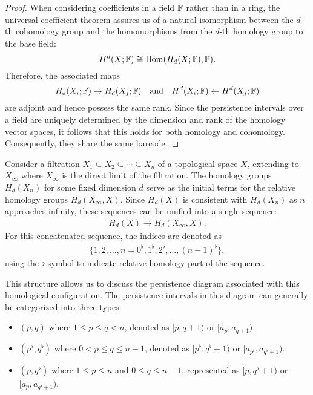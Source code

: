 \begin{proof}
When considering coefficients in a field ${\mathbb{F}}$ rather than in a ring, the universal coefficient theorem assures us of a natural isomorphism between the $d$-th cohomology group and the homomorphisms from the $d$-th homology group to the base field:
\begin{equation}
H^{d}(X; {\mathbb{F}}) \cong \operatorname{Hom}(H_{d}(X; {\mathbb{F}}), {\mathbb{F}}).
\end{equation}
Therefore, the associated maps
\begin{equation}
H_{d}(X_{i}; {\mathbb{F}}) \rightarrow H_{d}(X_{j}; {\mathbb{F}}) \quad \text{and} \quad H^{d}(X_{i}; {\mathbb{F}}) \leftarrow H^{d}(X_{j}; {\mathbb{F}})
\end{equation}
are adjoint and hence possess the same rank. Since the persistence intervals over a field are uniquely determined by the dimension and rank of the homology vector spaces, it follows that this holds for both homology and cohomology. Consequently, they share the same barcode.
\end{proof}

Consider a filtration $X_{1} \subseteq X_{2} \subseteq \cdots \subseteq X_{n}$ of a topological space $X$, extending to $X_{\infty}$ where $X_{\infty}$ is the direct limit of the filtration. The homology groups $H_{d}(X_{n})$ for some fixed dimension $d$ serve as the initial terms for the relative homology groups $H_{d}(X_{\infty}, X)$. Since $H_{d}(X)$ is consistent with $H_{d}(X_{n})$ as $n$ approaches infinity, these sequences can be unified into a single sequence:
\begin{align}
H_{d}(X) \to H_{d}(X_{\infty}, X).
\end{align}
For this concatenated sequence, the indices are denoted as
\begin{align}
\{1, 2, \ldots, n = 0^{\flat}, 1^{\flat}, 2^{\flat}, \ldots, (n-1)^{\flat}\},
\end{align}
using the $\flat$ symbol to indicate relative homology part of the sequence.

This structure allows us to discuss the persistence diagram associated with this homological configuration. The persistence intervals in this diagram can generally be categorized into three types:

\begin{itemize}
	\item $(p, q)$ where $1 \leq p \leq q < n$, denoted as
		$[p, q+1)$ or $[a_{p}, a_{q+1})$.

	\item $(p^{\flat}, q^{\flat})$ where $0 < p \leq q \leq n
		-1$, denoted as $[p^{\flat}, q^{\flat}+1)$ or $[a_{p^\flat}, a_{q^\flat+1})$.

	\item $(p, q^{\flat})$ where $1 \leq p \leq n$ and $0 \leq
		q \leq n-1$, represented as $[p, q^{\flat}+1)$ or $[a_{p}, a_{q^\flat+1})$.
\end{itemize}


